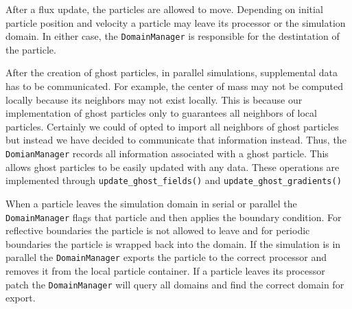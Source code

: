 After a flux update, the particles are allowed to move. Depending on initial particle position and
velocity a particle may leave its processor or the simulation domain. In either case, the 
\lstinline{DomainManager} is responsible for the destintation of the particle.

After the creation of ghost particles, in parallel simulations, supplemental data has to be communicated. 
For example, the center of mass may not be computed locally because its neighbors may not exist locally.
This is because our implementation of ghost particles only to guarantees all neighbors of local
particles. Certainly we could of opted to import all neighbors of ghost particles but instead we have 
decided to communicate that information instead. Thus, the \lstinline{DomianManager} records all information
associated with a ghost particle. This allows ghost particles to be easily updated with any data. These
operations are implemented through \lstinline{update_ghost_fields()} and 
\lstinline{update_ghost_gradients()}

When a particle leaves the simulation domain in serial or parallel the \lstinline{DomainManager}
flags that particle and then applies the boundary condition. For reflective boundaries the particle is not
allowed to leave and for periodic boundaries the particle is wrapped back into the domain. If the simulation
is in parallel the \lstinline{DomainManager} exports the particle to the correct processor and removes
it from the local particle container. If a particle leaves its processor patch the \lstinline{DomainManager}
will query all domains and find the correct domain for export.

